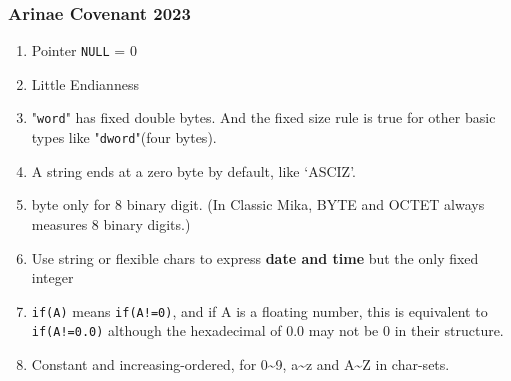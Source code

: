 

\subsubsection{Arinae Covenant 2023}

\begin{enumerate}

\item Pointer \texttt{NULL} = 0
\item Little Endianness
\item "\texttt{word}" has fixed double bytes. And the fixed size rule is true for other basic types like "\texttt{dword}"(four bytes).
\item A string ends at a zero byte by default, like `ASCIZ'.
\item byte only for 8 binary digit. (In Classic Mika, BYTE and OCTET always measures 8 binary digits.)
\item Use string or flexible chars to express \textbf{date and time} but the only fixed integer
\item \verb|if(A)| means \verb|if(A!=0)|, and if A is a floating number, this is equivalent to \verb|if(A!=0.0)| although the hexadecimal of 0.0 may not be 0 in their structure.
\item Constant and increasing-ordered, for 0\textasciitilde{}9, a\textasciitilde{}z and A\textasciitilde{}Z in char-sets.
\end{enumerate}


